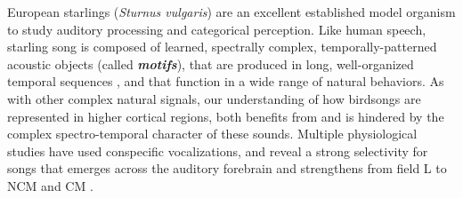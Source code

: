 European starlings ({\it Sturnus vulgaris}) are an excellent established model organism to study auditory processing and categorical perception. Like human speech, starling song is composed of learned, spectrally complex, temporally-patterned acoustic objects (called \textit{\textbf{motifs}}), that are produced in long, well-organized temporal sequences \cite{gentner2003neuronal}, and that function in a wide range of natural behaviors. As with other complex natural signals, our understanding of how birdsongs are represented in higher cortical regions, both benefits from and is hindered by the complex spectro-temporal character of these sounds. Multiple physiological studies have used conspecific vocalizations, and reveal a strong selectivity for songs that emerges across the auditory forebrain and strengthens from field L to \ac{NCM} and \ac{CM} \cite{gentner2003neuronal, gentner2004neural, thompson2010song, jeanne2011emergence}.


